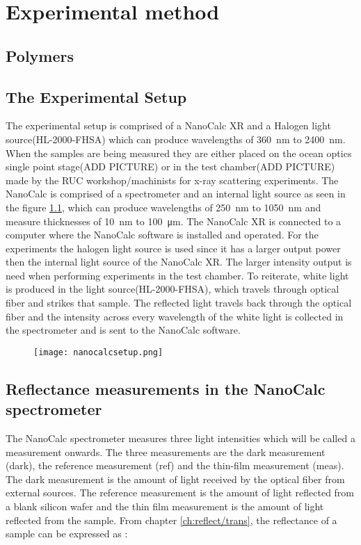 \documentclass[MasterThesisMain.tex]{subfiles}
\begin{document}
	\chapter{Experimental method}\label{experimentalmethod}
	
	\section{Polymers}
	
	\section{The Experimental Setup}
The experimental setup is comprised of a NanoCalc XR and a Halogen light source(HL-2000-FHSA) which can produce wavelengths of \SI{360}{\nano\meter} to \SI{2400}{\nano\meter}. When the samples are being measured they are either placed on the ocean optics single point stage(ADD PICTURE) or in the test chamber(ADD PICTURE) made by the RUC workshop/machinists for x-ray scattering experiments. The NanoCalc is comprised of a spectrometer and an internal light source as seen in the figure \ref{fig:nanocalcsetup}, which can produce wavelengths of \SI{250}{\nano\meter} to \SI{1050}{\nano\meter} and measure thicknesses of \SI{10}{\nano\meter} to \SI{100}{\micro\meter}. The NanoCalc XR is connected to a computer where the NanoCalc software is installed and operated. For the experiments the halogen light source is used since it has a larger output power then the internal light source of the NanoCalc XR. The larger intensity output is need when performing experiments in the test chamber. To reiterate, white light is produced in the light source(HL-2000-FHSA), which travels through optical fiber and strikes that sample. The reflected light travels back through the optical fiber and the intensity across every wavelength of the white light is collected in the spectrometer and is sent to the NanoCalc software.  
	
	\begin{figure}
	\centering
		\texttt{[image: nanocalcsetup.png]}
		\caption{}
		\label{fig:nanocalcsetup}
	\end{figure}
	
	\section{Reflectance measurements in the NanoCalc spectrometer}
The NanoCalc spectrometer measures three light intensities which will be called a measurement onwards. The three measurements are the dark measurement (dark), the reference measurement (ref) and the thin-film measurement (meas). The dark measurement is the amount of light received by the optical fiber from external sources. The reference measurement is the amount of light reflected from a blank silicon wafer and the thin film measurement is the amount of light reflected from the sample. From chapter \ref{ch:reflect/trans}, the reflectance of a sample can be expressed as :
\end{document}
